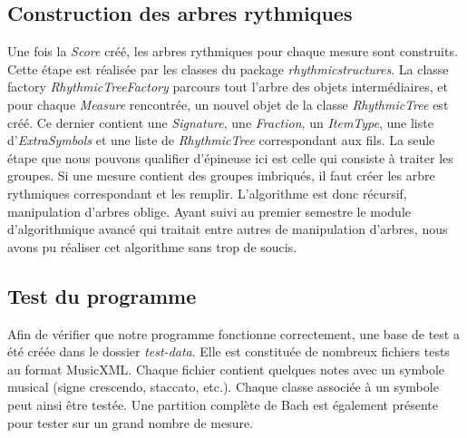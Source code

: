 \subsection{Construction des arbres rythmiques}

Une fois la \emph{Score} créé, les arbres rythmiques pour chaque mesure sont construits. Cette étape est réalisée par les classes du package \emph{rhythmicstructures}. La classe factory \emph{RhythmicTreeFactory} parcours tout l'arbre des objets intermédiaires, et pour chaque \emph{Measure} rencontrée, un nouvel objet de la classe \emph{RhythmicTree} est créé. Ce dernier contient une \emph{Signature}, une \emph{Fraction}, un \emph{ItemType}, une liste d'\emph{ExtraSymbols} et une liste de \emph{RhythmicTree} correspondant aux fils. La seule étape que nous pouvons qualifier d'épineuse ici est celle qui consiste à traiter les groupes. Si une mesure contient des groupes imbriqués, il faut créer les arbre rythmiques correspondant et les remplir. L'algorithme est donc récursif, manipulation d'arbres oblige. Ayant suivi au premier semestre le module d'algorithmique avancé qui traitait entre autres de manipulation d'arbres, nous avons pu réaliser cet algorithme sans trop de soucis.


\subsection{Test du programme}

Afin de vérifier que notre programme fonctionne correctement, une base de test a été créée dans le dossier \emph{test-data}. Elle est constituée de nombreux fichiers tests au format MusicXML. Chaque fichier contient quelques notes avec un symbole musical (signe crescendo, staccato, etc.). Chaque classe associée à un symbole peut ainsi être testée. Une partition complète de Bach est également présente pour tester sur un grand nombre de mesure.
